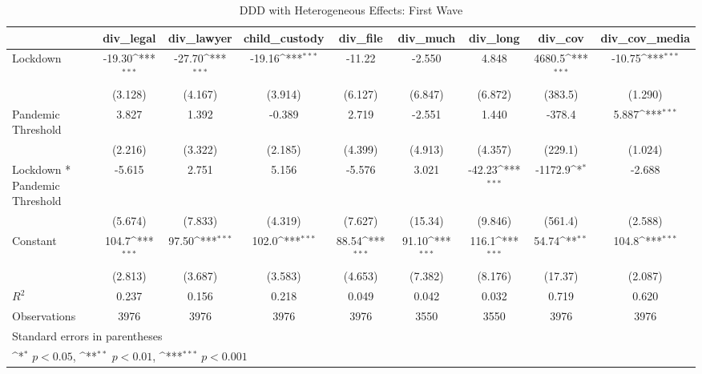\documentclass{article}
\begin{document}
{
\def\sym#1{\ifmmode^{#1}\else\(^{#1}\)\fi}
\begin{longtable}{l*{8}{c}}
\caption{DDD with Heterogeneous Effects: First Wave}\\
\hline\hline\endfirsthead\hline\endhead\hline\endfoot\endlastfoot
                &\multicolumn{1}{c}{div\_legal}&\multicolumn{1}{c}{div\_lawyer}&\multicolumn{1}{c}{child\_custody}&\multicolumn{1}{c}{div\_file}&\multicolumn{1}{c}{div\_much}&\multicolumn{1}{c}{div\_long}&\multicolumn{1}{c}{div\_cov}&\multicolumn{1}{c}{div\_cov\_media}\\
\hline
Lockdown        &   -19.30\sym{***}&   -27.70\sym{***}&   -19.16\sym{***}&   -11.22         &   -2.550         &    4.848         &   4680.5\sym{***}&   -10.75\sym{***}\\
                &  (3.128)         &  (4.167)         &  (3.914)         &  (6.127)         &  (6.847)         &  (6.872)         &  (383.5)         &  (1.290)         \\
Pandemic Threshold&    3.827         &    1.392         &   -0.389         &    2.719         &   -2.551         &    1.440         &   -378.4         &    5.887\sym{***}\\
                &  (2.216)         &  (3.322)         &  (2.185)         &  (4.399)         &  (4.913)         &  (4.357)         &  (229.1)         &  (1.024)         \\
Lockdown * Pandemic Threshold&   -5.615         &    2.751         &    5.156         &   -5.576         &    3.021         &   -42.23\sym{***}&  -1172.9\sym{*}  &   -2.688         \\
                &  (5.674)         &  (7.833)         &  (4.319)         &  (7.627)         &  (15.34)         &  (9.846)         &  (561.4)         &  (2.588)         \\
Constant        &    104.7\sym{***}&    97.50\sym{***}&    102.0\sym{***}&    88.54\sym{***}&    91.10\sym{***}&    116.1\sym{***}&    54.74\sym{**} &    104.8\sym{***}\\
                &  (2.813)         &  (3.687)         &  (3.583)         &  (4.653)         &  (7.382)         &  (8.176)         &  (17.37)         &  (2.087)         \\
\hline
\(R^{2}\)       &    0.237         &    0.156         &    0.218         &    0.049         &    0.042         &    0.032         &    0.719         &    0.620         \\
Observations    &     3976         &     3976         &     3976         &     3976         &     3550         &     3550         &     3976         &     3976         \\
\hline\hline
\multicolumn{9}{l}{\footnotesize Standard errors in parentheses}\\
\multicolumn{9}{l}{\footnotesize \sym{*} \(p<0.05\), \sym{**} \(p<0.01\), \sym{***} \(p<0.001\)}\\
\end{longtable}
}
\end{document}
